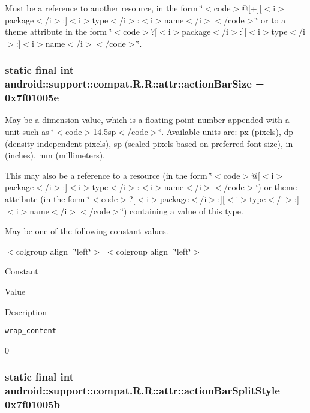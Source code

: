 Must be a reference to another resource, in the form \char`\"{}$<$code$>$@\mbox{[}+\mbox{]}\mbox{[}$<$i$>$package$<$/i$>$:\mbox{]}$<$i$>$type$<$/i$>$:$<$i$>$name$<$/i$>$$<$/code$>$\char`\"{} or to a theme attribute in the form \char`\"{}$<$code$>$?\mbox{[}$<$i$>$package$<$/i$>$:\mbox{]}\mbox{[}$<$i$>$type$<$/i$>$:\mbox{]}$<$i$>$name$<$/i$>$$<$/code$>$\char`\"{}. \hypertarget{classandroid_1_1support_1_1compat_1_1_r_1_1attr_237324a780420ec18d0667db40e551de}{
\subsubsection[{actionBarSize}]{\setlength{\rightskip}{0pt plus 5cm}static final int android::support::compat.R.R::attr::actionBarSize = 0x7f01005e}}
\label{classandroid_1_1support_1_1compat_1_1_r_1_1attr_237324a780420ec18d0667db40e551de}


May be a dimension value, which is a floating point number appended with a unit such as \char`\"{}$<$code$>$14.5sp$<$/code$>$\char`\"{}. Available units are: px (pixels), dp (density-independent pixels), sp (scaled pixels based on preferred font size), in (inches), mm (millimeters). 

This may also be a reference to a resource (in the form \char`\"{}$<$code$>$@\mbox{[}$<$i$>$package$<$/i$>$:\mbox{]}$<$i$>$type$<$/i$>$:$<$i$>$name$<$/i$>$$<$/code$>$\char`\"{}) or theme attribute (in the form \char`\"{}$<$code$>$?\mbox{[}$<$i$>$package$<$/i$>$:\mbox{]}\mbox{[}$<$i$>$type$<$/i$>$:\mbox{]}$<$i$>$name$<$/i$>$$<$/code$>$\char`\"{}) containing a value of this type. 

May be one of the following constant values. \begin{TabularC}{0}
\hline
\end{TabularC}
$<$colgroup align=\char`\"{}left\char`\"{}$>$ $<$colgroup align=\char`\"{}left\char`\"{}$>$ 

Constant

Value

Description 

{\tt wrap\_\-content}

0\hypertarget{classandroid_1_1support_1_1compat_1_1_r_1_1attr_229219d97192673508c5493eb5ee1faa}{
\subsubsection[{actionBarSplitStyle}]{\setlength{\rightskip}{0pt plus 5cm}static final int android::support::compat.R.R::attr::actionBarSplitStyle = 0x7f01005b}}
\label{classandroid_1_1support_1_1compat_1_1_r_1_1attr_229219d97192673508c5493eb5ee1faa}


